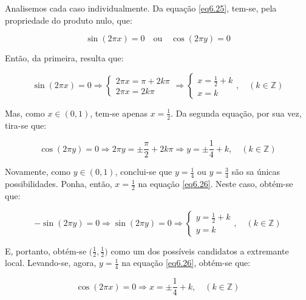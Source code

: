Analisemos cada caso individualmente. Da equação \ref{eq6.25}, tem-se, pela propriedade do produto nulo, que:


\begin{equation}
	\sin(2\pi x) = 0 \quad \text{ou} \quad \cos(2\pi y) = 0
\end{equation}

Então, da primeira, resulta que:

\begin{equation}
	\sin(2\pi x) = 0 \Rightarrow
	\begin{cases}
		2\pi x = \pi + 2k \pi \\
		2\pi x =  2k \pi 
	\end{cases} \Rightarrow \begin{cases}
		x = \frac{1}{2} + k  \\
		x =  k  
	\end{cases}, \quad (k \in \mathbb{Z})
\end{equation}

Mas, como $ x \in (0,1) $, tem-se apenas $ x=\frac{1}{2} $. Da segunda equação, por sua vez, tira-se que:

\begin{equation}
	\cos(2\pi y) = 0 \Rightarrow 2\pi y = \pm \frac{\pi}{2} + 2k\pi \Rightarrow y = \pm \frac{1}{4} + k, \quad (k \in \mathbb{Z})
\end{equation}

Novamente, como $ y \in (0,1) $, conclui-se que $ y=\frac{1}{4} $ ou $ y = \frac{3}{4} $ são sa únicas possibilidades. Ponha, então, $ x = \frac{1}{2} $ na equação \ref{eq6.26}. Neste caso, obtém-se que:

\begin{equation}
	-\sin(2\pi y)= 0 \Rightarrow \sin(2\pi y)= 0 \Rightarrow \begin{cases}
		y = \frac{1}{2} + k  \\
		y =  k  
	\end{cases}, \quad (k \in \mathbb{Z})
\end{equation}

E, portanto, obtém-se $ \big(\frac{1}{2},\frac{1}{2}\big) $ como um dos possíveis candidatos a extremante local. Levando-se, agora, $ y = \frac{1}{4} $ na equação \ref{eq6.26}, obtém-se que:

\begin{equation}
	\cos(2\pi x) = 0 \Rightarrow x = \pm \frac{1}{4} + k, \quad (k \in \mathbb{Z})
\end{equation}

